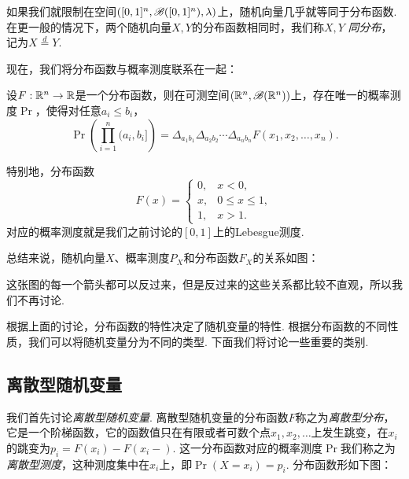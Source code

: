 如果我们就限制在空间$([0,1]^n,\mathscr{B}([0,1]^n),\lambda)$上，随机向量几乎就等同于分布函数. 在更一般的情况下，两个随机向量$X,Y$的分布函数相同时，我们称$X,Y$ \emph{同分布}，记为$X \stackrel{d}{=} Y$.

现在，我们将分布函数与概率测度联系在一起：

\begin{theorem}\label{thm:uniqueness-of-distribution-function}
设$F:\mathbb{R}^n\to\mathbb{R}$是一个分布函数，则在可测空间$(\mathbb{R}^n,\mathscr{B}(\mathbb{R}^n))$上，存在唯一的概率测度$\Pr$，使得对任意$a_i\leq b_i$，
\[
    \Pr\left(\prod_{i=1}^n(a_i,b_i]\right) = \Delta_{a_1b_1}\Delta_{a_2b_2}\cdots\Delta_{a_nb_n}F(x_1,x_2,\ldots,x_n).
\]
\end{theorem}

特别地，分布函数
\[F(x)=\begin{cases}
    0,&x<0,\\
    x,&0\leq x\leq 1,\\
    1,&x>1.
\end{cases}\]
对应的概率测度就是我们之前讨论的$[0,1]$上的Lebesgue测度.

总结来说，随机向量$X$、概率测度$P_X$和分布函数$F_X$的关系如图：
\begin{center}
\end{center}

这张图的每一个箭头都可以反过来，但是反过来的这些关系都比较不直观，所以我们不再讨论. 

根据上面的讨论，分布函数的特性决定了随机变量的特性. 根据分布函数的不同性质，我们可以将随机变量分为不同的类型. 下面我们将讨论一些重要的类别. 

\subsection{离散型随机变量}

我们首先讨论\emph{离散型随机变量}. 离散型随机变量的分布函数$F$称之为\emph{离散型分布}，它是一个阶梯函数，它的函数值只在有限或者可数个点$x_1,x_2,\dots$上发生跳变，在$x_i$的跳变为$p_i=F(x_i)-F(x_i-)$. 这一分布函数对应的概率测度$\Pr$我们称之为\emph{离散型测度}，这种测度集中在$x_i$上，即$\Pr(X=x_i)=p_i$. 分布函数形如下图：

